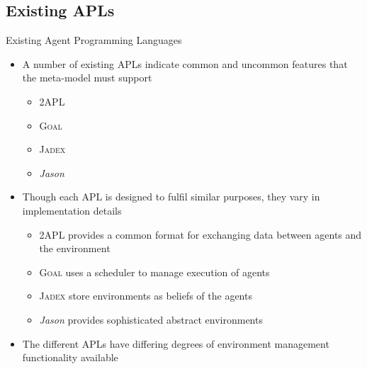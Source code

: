 \documentclass[t]{beamer}
\begin{document}
\subsection{Existing APLs}
\begin{frame}{Existing Agent Programming Languages}
	\begin{itemize}[<+->]
		\item A number of existing APLs indicate common and uncommon features that the meta-model must support
		\begin{itemize}
		\item<2-> 2APL
		\item<2-> \textsc{Goal}
		\item<2-> \textsc{Jadex}
		\item<2-> \textit{Jason}
		\end{itemize}
		\pause
		\item Though each APL is designed to fulfil similar purposes, they vary in implementation details
		\begin{itemize}
			\item 2APL provides a common format for exchanging data between agents and the environment
			\item \textsc{Goal} uses a scheduler to manage execution of agents
			\item \textsc{Jadex} store environments as beliefs of the agents
			\item \textit{Jason} provides sophisticated abstract environments
		\end{itemize}
		\item The different APLs have differing degrees of environment management functionality available
	\end{itemize}
\end{frame}
\end{document}
